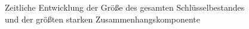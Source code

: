 \begin{figure}[th!]
  \centering
  \caption{Zeitliche Entwicklung der Größe des gesamten
    Schlüsselbestandes  und der
      grö{\ss}ten starken Zusammenhangskomponente }
  \label{fig:size-dev}
\end{figure}


